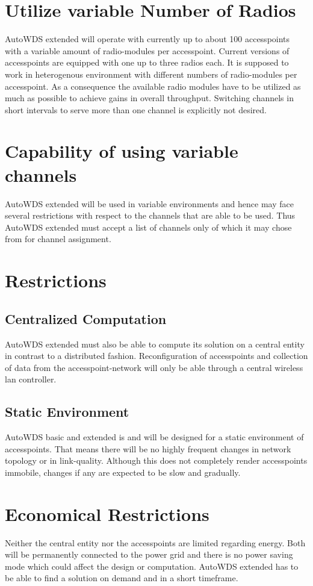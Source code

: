 \section{Utilize variable Number of Radios}
  AutoWDS extended will operate with currently up to about 100 accesspoints with a variable amount of radio-modules per accesspoint.
  Current versions of accesspoints are equipped with one up to three radios each. It is supposed to work in heterogenous environment with 
  different numbers of radio-modules per accesspoint. As a consequence the available radio modules 
  have to be utilized as much as possible to achieve gains in overall throughput.
  Switching channels in short intervals to serve more than one channel is explicitly not desired.
  \section{Capability of using variable channels}
  AutoWDS extended will be used in variable environments and hence may face several restrictions with respect to the channels that are able to be used.
  Thus AutoWDS extended must accept a list of channels only of which it may chose from for channel assignment.
  \section{Restrictions}
  \subsection{Centralized Computation}
    AutoWDS extended must also be able to compute its solution on a central entity in contrast to a distributed fashion.
    Reconfiguration of accesspoints and collection of data from the accesspoint-network will only be able through a central wireless lan controller.
  \subsection{Static Environment}
    AutoWDS basic and extended is and will be designed for a static environment of accesspoints. That means there will be no highly frequent changes in
    network topology or in link-quality. Although this does not completely render accesspoints immobile, changes if any are expected to be slow and gradually.
\section{Economical Restrictions}
  Neither the central entity nor the accesspoints are limited regarding energy. Both will be permanently connected to the power grid and there is no power saving mode
  which could affect the design or computation.
  AutoWDS extended has to be able to find a solution on demand and in a short timeframe.
